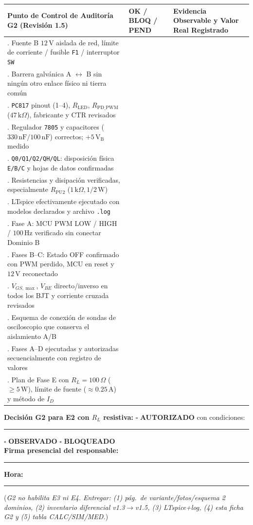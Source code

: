 \documentclass[10pt, a4paper, landscape]{article}
\begin{document}
\par\vspace{0.08cm}\noindent
\renewcommand{\arraystretch}{1.18}
{\footnotesize
\begin{tabularx}{\linewidth}{|>{\raggedright\arraybackslash}p{9.2cm}|>{\centering\arraybackslash}p{2.8cm}|>{\raggedright\arraybackslash}X|}
\hline
\rowcolor{ucbgray}
\textbf{Punto de Control de Auditoría G2 (Revisión 1.5)} & \textbf{OK / BLOQ / PEND} & \textbf{Evidencia Observable y Valor Real Registrado} \\ \hline
1. Fuente B $12\,\text{V}$ aislada de red, límite de corriente / fusible \texttt{F1} / interruptor \texttt{SW} & & \\ \hline
2. Barrera galvánica A $\leftrightarrow$ B sin ningún otro enlace físico ni tierra común & & \\ \hline
3. \texttt{PC817} pinout (1--4), $R_{\text{LED}}$, $R_{\text{PD\_PWM}}$ ($47\,\text{k}\Omega$), fabricante y CTR revisados & & \\ \hline
4. Regulador \texttt{7805} y capacitores ($330\,\text{nF} / 100\,\text{nF}$) correctos; $+5\,\text{V}_{\text{B}}$ medido & & \\ \hline
5. \texttt{Q0/Q1/Q2/QH/QL}: disposición física \texttt{E/B/C} y hojas de datos confirmadas & & \\ \hline
6. Resistencias y disipación verificadas, especialmente $R_{\text{PU2}}$ ($1\,\text{k}\Omega, 1/2\,\text{W}$) & & \\ \hline
7. LTspice efectivamente ejecutado con modelos declarados y archivo \texttt{.log} & & \\ \hline
8. Fase A: MCU PWM LOW / HIGH / $100\,\text{Hz}$ verificado sin conectar Dominio B & & \\ \hline
9. Fases B--C: Estado OFF confirmado con PWM perdido, MCU en reset y $12\,\text{V}$ reconectado & & \\ \hline
10. $V_{GS,\max}$, $V_{BE}$ directo/inverso en todos los BJT y corriente cruzada revisados & & \\ \hline
11. Esquema de conexión de sondas de osciloscopio que conserva el aislamiento A/B & & \\ \hline
12. Fases A--D ejecutadas y autorizadas secuencialmente con registro de valores & & \\ \hline
13. Plan de Fase E con $R_L = 100\,\Omega$ ($\ge 5\,\text{W}$), límite de fuente ($\approx 0.25\,\text{A}$) y método de $I_D$ & & \\ \hline
\end{tabularx}
}

\vspace{0.12cm}
\noindent
\textbf{Decisión G2 para E2 con $R_L$ resistiva:} \quad $\square$ \textbf{AUTORIZADO} con condiciones: \rule{5.5cm}{0.4pt} \quad $\square$ \textbf{OBSERVADO} \quad $\square$ \textbf{BLOQUEADO} \\[0.08cm]
\textbf{Firma presencial del responsable:} \rule{5.0cm}{0.4pt} \quad \textbf{Hora:} \rule{2.5cm}{0.4pt} \quad (\textit{G2 no habilita E3 ni E4. Entregar: (1) pág.\ de variante/fotos/esquema 2 dominios, (2) inventario diferencial v1.3$\rightarrow$v1.5, (3) LTspice+log, (4) esta ficha G2 y (5) tabla CALC/SIM/MED.})
\end{document}
